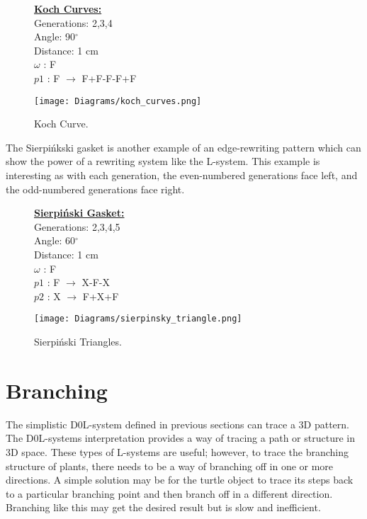 \begin{figure}[htbp]
	\raggedright
	\textbf{\underline{Koch Curves:}} \\
	Generations: 2,3,4\\
	Angle: 90$^\circ$\\
	Distance: 1 cm\\
	$\omega$ : F \\
	$p1$ : F $\rightarrow$ F+F-F-F+F\\
	{\centering
		\vspace{7px}
		\texttt{[image: Diagrams/koch\_curves.png]}
		\caption{Koch Curve.} \label{KochSnowflake}
	}
\end{figure}
\FloatBarrier

\noindent
The Sierpi\'{n}kski gasket is another example of an edge-rewriting pattern which can show the power of a rewriting system like the L-system. This example is interesting as with each generation, the even-numbered generations face left, and the odd-numbered generations face right.


\begin{figure}[htbp]
	\raggedright
	\textbf{\underline{Sierpi\'{n}ski Gasket:}} \\
	Generations: 2,3,4,5\\
	Angle: 60$^\circ$\\
	Distance: 1 cm\\
	$\omega$ : F\\
	$p1$ : F $\rightarrow$ X-F-X\\
	$p2$ : X $\rightarrow$ F+X+F\\
	{\centering
		\vspace{7px}
		\texttt{[image: Diagrams/sierpinsky\_triangle.png]}
		\caption{Sierpi\'{n}ski Triangles.}
	}
\end{figure}
\FloatBarrier

\section{Branching} \label{branching}


The simplistic D0L-system defined in previous sections can trace a 3D pattern. The D0L-systems interpretation provides a way of tracing a path or structure in 3D space. These types of L-systems are useful; however, to trace the branching structure of plants, there needs to be a way of branching off in one or more directions. A simple solution may be for the turtle object to trace its steps back to a particular branching point and then branch off in a different direction. Branching like this may get the desired result but is slow and inefficient. 

